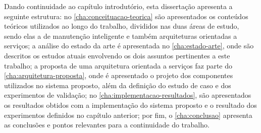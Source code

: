 
Dando continuidade ao capítulo introdutório, esta dissertação apresenta a seguinte estrutura: no
\cref{cha:conceituacao-teorica} são apresentados os conteúdos teóricos utilizados ao longo do
trabalho, divididos nas duas áreas de estudo, sendo elas a de manutenção inteligente e também
arquiteturas orientadas a serviços; a análise do estado da arte é apresentada no
\cref{cha:estado-arte}, onde são descritos os estudos atuais envolvendo os dois assuntos
pertinentes a este trabalho; a proposta de uma arquitetura orientada a serviços faz parte do
\cref{cha:arquitetura-proposta}, onde é apresentado o projeto dos componentes utilizados no sistema
proposto, além da definição do estudo de caso e dos experimentos de validação; no
\cref{cha:implementacao-resultados}, são apresentados os resultados obtidos com a implementação do
sistema proposto e o resultado dos experimentos definidos no capítulo anterior; por fim, o
\cref{cha:conclusao} apresenta as conclusões e pontos relevantes para a continuidade do trabalho.
